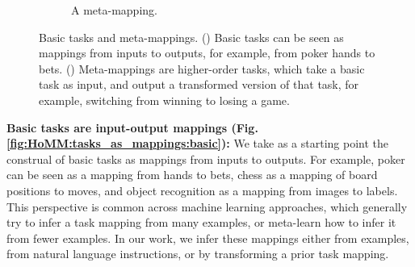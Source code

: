 \begin{figure}
\begin{subfigure}{0.33\textwidth}
\caption{A meta-mapping.} \label{fig:HoMM:tasks_as_mappings:meta}
\end{subfigure}

\caption[Basic tasks and meta-mappings.]{Basic tasks and meta-mappings. () Basic tasks can be seen as mappings from inputs to outputs, for example, from poker hands to bets. () Meta-mappings are higher-order tasks, which take a basic task as input, and output a transformed version of that task, for example, switching from winning to losing a game.} \label{fig:HoMM:tasks_as_mappings}
\end{figure}

\textbf{Basic tasks are input-output mappings (Fig. \ref{fig:HoMM:tasks_as_mappings:basic}):} We take as a starting point the construal of basic tasks as mappings from inputs to outputs. For example, poker can be seen as a mapping from hands to bets, chess as a mapping of board positions to moves, and object recognition as a mapping from images to labels. This perspective is common across machine learning approaches, which generally try to infer a task mapping from many examples, or meta-learn how to infer it from fewer examples. In our work, we infer these mappings either from examples, from natural language instructions, or by transforming a prior task mapping. 

